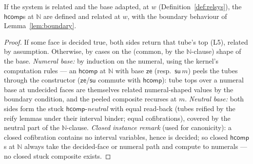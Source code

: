 \documentclass{lmcs}
\newcommand{\hcomp}{\mathsf{hcomp}}
\begin{document}
\begin{lem}[$\hcomp$ at $\mathbb{N}$]\label{lem:corehcompN}
  If the system is related and the base adapted, at $w$
  (Definition~\ref{def:relsys}), the $\hcomp$s at $\mathbb{N}$ are
  defined and related at $w$, with the boundary behaviour of
  Lemma~\ref{lem:boundary}.
\end{lem}
\begin{proof}
  If some face is decided true, both sides return that tube's top
  (L5), related by assumption.  Otherwise, by cases on the (common,
  by the $\mathbb{N}$-clause) shape of the base.  \emph{Numeral
  base:} by induction on the numeral, using the kernel's
  computation rules --- an $\hcomp$ at $\mathbb{N}$ with base
  $\mathsf{ze}$ (resp.\ $\mathsf{su}\,m$) peels the tubes through
  the constructor ($\mathsf{ze}$/$\mathsf{su}$ commute with
  $\hcomp$): tube tops over a numeral base at undecided faces are
  themselves related numeral-shaped values by the boundary
  condition, and the peeled composite recurses at $m$.
  \emph{Neutral base:} both sides form the stuck
  $\hcomp$-\emph{neutral} with equal read-back (tubes reified by
  the reify lemmas under their interval binder; equal
  cofibrations), covered by the neutral part of the
  $\mathbb{N}$-clause.  \emph{Closed instance remark} (used for
  canonicity): a closed cofibration contains no interval
  variables, hence is decided; so closed $\hcomp$s at $\mathbb{N}$
  always take the decided-face or numeral path and compute to
  numerals --- no closed stuck composite exists.
\end{proof}
\end{document}
